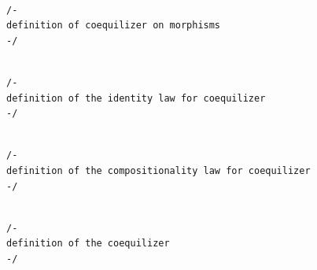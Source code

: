 \documentclass{book}
\newcounter{lcounter}
\begin{document}
\begin{center}
\begin{tcolorbox}[width=5in,colback={white},title={\begin{center}\texttt{Lean \thelcounter} \addtocounter{lcounter}{1}  \end{center}},colbacktitle=Blue,coltitle=black]
\begin{verbatim}

/-
definition of coequilizer on morphisms
-/

\end{verbatim}%
\end{tcolorbox}
\end{center}

\begin{center}
\begin{tcolorbox}[width=5in,colback={white},title={\begin{center}\texttt{Lean \thelcounter} \addtocounter{lcounter}{1}  \end{center}},colbacktitle=Blue,coltitle=black]
\begin{verbatim}

/-
definition of the identity law for coequilizer
-/

\end{verbatim}%
\end{tcolorbox}
\end{center}

\begin{center}
\begin{tcolorbox}[width=5in,colback={white},title={\begin{center}\texttt{Lean \thelcounter} \addtocounter{lcounter}{1}  \end{center}},colbacktitle=Blue,coltitle=black]
\begin{verbatim}

/-
definition of the compositionality law for coequilizer
-/

\end{verbatim}%
\end{tcolorbox}
\end{center}

\begin{center}
\begin{tcolorbox}[width=5in,colback={white},title={\begin{center}\texttt{Lean \thelcounter} \addtocounter{lcounter}{1}  \end{center}},colbacktitle=Blue,coltitle=black]
\begin{verbatim}

/-
definition of the coequilizer
-/

\end{verbatim}%
\end{tcolorbox}
\end{center}
\end{document}
